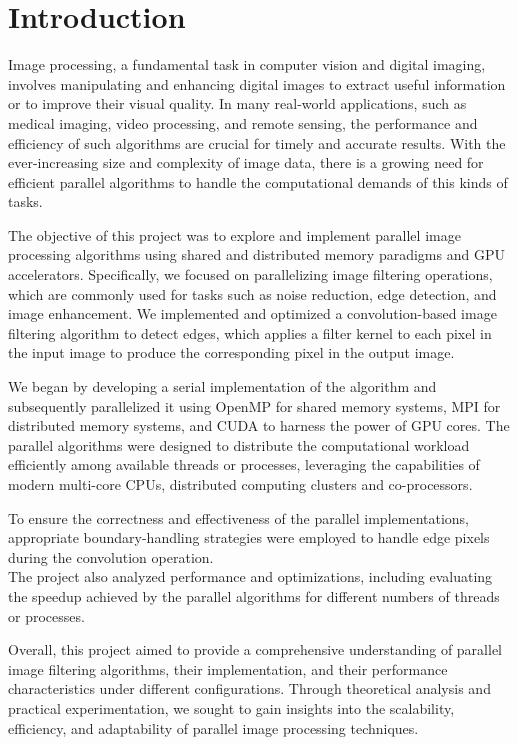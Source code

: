 \section{Introduction}

Image processing, a fundamental task in computer vision and digital imaging, %
involves manipulating and enhancing digital images to extract useful information %
or to improve their visual quality. In many real-world applications, such as medical %
imaging, video processing, and remote sensing, the performance and efficiency of %
such algorithms are crucial for timely and accurate results. With the %
ever-increasing size and complexity of image data, there is a growing need for %
efficient parallel algorithms to handle the computational demands of this kinds %
of tasks.

The objective of this project was to explore and implement parallel image %
processing algorithms using shared and distributed memory paradigms and GPU accelerators. %
Specifically, we focused on parallelizing image filtering operations, which are %
commonly used for tasks such as noise reduction, edge detection, and image enhancement. %
We implemented and optimized a convolution-based image filtering %
algorithm to detect edges, which applies a filter kernel to each pixel in the %
input image to produce the corresponding pixel in the output image.

We began by developing a serial implementation of the algorithm %
and subsequently parallelized it using OpenMP for shared memory systems, MPI %
for distributed memory systems, and CUDA to harness the power of GPU cores. The parallel %
algorithms were designed to distribute the computational workload efficiently %
among available threads or processes, leveraging the capabilities of modern %
multi-core CPUs, distributed computing clusters and co-processors.

To ensure the correctness and effectiveness of the parallel implementations, %
appropriate boundary-handling strategies were employed to handle edge pixels %
during the convolution operation.\\
The project also analyzed performance and optimizations, including %
evaluating the speedup achieved by the parallel algorithms for different numbers %
of threads or processes.

Overall, this project aimed to provide a comprehensive understanding of parallel %
image filtering algorithms, their implementation, and their performance characteristics %
under different configurations. Through theoretical analysis and practical %
experimentation, we sought to gain insights into the scalability, %
efficiency, and adaptability of parallel image processing techniques.
